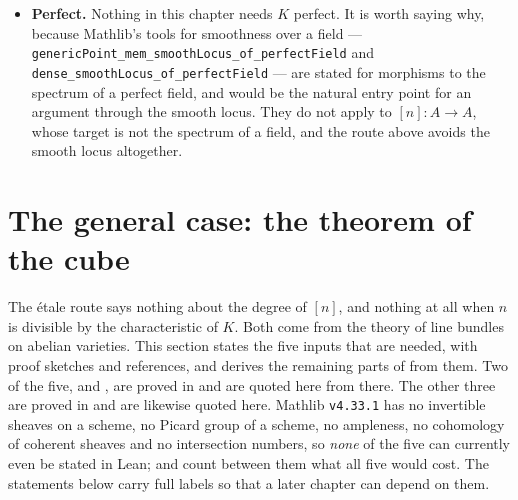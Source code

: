 \begin{remark}
\begin{itemize}
    algebra as a product of copies of the base field needs only that $K$ is
    separably closed, and that is how Mathlib states it; the residue fields of
    a finite \'etale $K$-scheme are separable over $K$, so the passage from
    points of the scheme to $K$-points needs only separable closedness as well.
    We state the proposition over an algebraically closed field because that is
    the hypothesis carried by .
  \item \textbf{Perfect.}  Nothing in this chapter needs $K$ perfect.  It is
    worth saying why, because Mathlib's tools for smoothness over a field ---
    \texttt{genericPoint\_mem\_smoothLocus\_of\_perfectField} and
    \texttt{dense\_smoothLocus\_of\_perfectField} --- are stated for morphisms
    to the spectrum of a perfect field, and would be the natural entry point
    for an argument through the smooth locus.  They do not apply to
    $[n]\colon A\to A$, whose target is not the spectrum of a field, and the
    route above avoids the smooth locus altogether.
\end{itemize}
\end{remark}

\section{The general case: the theorem of the cube}\label{sec:av-cube}

The \'etale route says nothing about the degree of $[n]$, and nothing at all
when $n$ is divisible by the characteristic of $K$.  Both come from the theory
of line bundles on abelian varieties.  This section states the five inputs that
are needed, with proof sketches and references, and derives the remaining parts
of  from them.  Two of the five,  and
, are proved in  and are quoted
here from there.  The other three are proved in  and are
likewise quoted here.  Mathlib \texttt{v4.33.1} has no invertible sheaves on a
scheme, no Picard group of a scheme, no ampleness, no cohomology of coherent
sheaves and no intersection numbers, so \emph{none} of the five can currently
even be stated in Lean;  and  count
between them what all five would cost.  The statements below carry full labels
so that a later chapter can depend on them.

